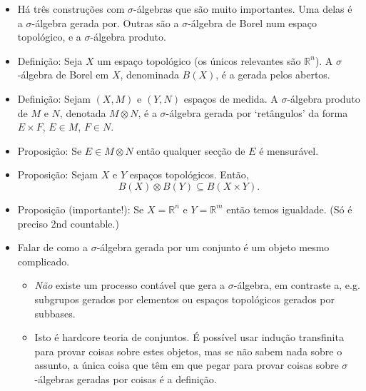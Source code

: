 \documentclass{article}
\newcommand{\R}{\mathbb{R}}
\begin{document}
\begin{itemize}
\begin{itemize}
\item A $\sigma$-álgebra de Borel em $\R$ tem mil definições diferentes possíveis:
\begin{itemize}
\item Intervalos
\item Intervalos meio-abertos
\item Intervalos abertos
\item Abertos
\item Fechados
\item Compactos
\item Intervalos $\left[a, \infty\right[$
\item Intervalos $\left]a, \infty\right[$
\end{itemize}
\item (Talvez) Exercício 1.2.5 do Folland: $M(A) = \bigcup_F M(F)$, onde a união é tomada sob subconjuntos contáveis de $A$.
\end{itemize}
\item Há três construções com $\sigma$-álgebras que são muito importantes. Uma delas é a $\sigma$-álgebra gerada por. Outras são a $\sigma$-álgebra de Borel num espaço topológico, e a $\sigma$-álgebra produto.
\item Definição: Seja $X$ um espaço topológico (os únicos relevantes são $\R^n$). A $\sigma$-álgebra de Borel em $X$, denominada $B(X)$, é a gerada pelos abertos.
\item Definição: Sejam $(X,M)$ e $(Y,N)$ espaços de medida. A $\sigma$-álgebra produto de $M$ e $N$, denotada $M \otimes N$, é a $\sigma$-álgebra gerada por `retângulos' da forma $E \times F$, $E \in M$, $F \in N$.
\item Proposição: Se $E \in M \otimes N$ então qualquer secção de $E$ é mensurável.
\item Proposição: Sejam $X$ e $Y$ espaços topológicos. Então,
\[B(X) \otimes B(Y) \subseteq B(X \times Y).\]
\item Proposição (importante!): Se $X = \R^n$ e $Y = \R^m$ então temos igualdade. (Só é preciso 2nd countable.)
\item Falar de como a $\sigma$-álgebra gerada por um conjunto é um objeto mesmo complicado.
\begin{itemize}
\item \emph{Não} existe um processo contável que gera a $\sigma$-álgebra, em contraste a, e.g. subgrupos gerados por elementos ou espaços topológicos gerados por subbases.
\item Isto é hardcore teoria de conjuntos. É possível usar indução transfinita para provar coisas sobre estes objetos, mas se não sabem nada sobre o assunto, a única coisa que têm em que pegar para provar coisas sobre $\sigma$-álgebras geradas por coisas é a definição.
\end{itemize}


\end{itemize}
\end{document}
